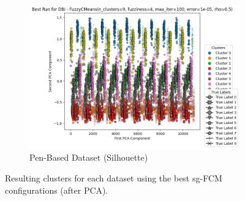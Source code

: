 \begin{figure}[H]
	\begin{subfigure}{0.32\textwidth}
		\centering
		\includegraphics[width=\linewidth]{figures/FuzzyCMeans/PenBased/best_run_DBI.png}
		\caption{Pen-Based Dataset (Silhouette)}
	\end{subfigure}
	\caption{Resulting clusters for each dataset using the best sg-FCM configurations (after PCA).}
	\label{fig:sgfcm:clusters}
\end{figure}
